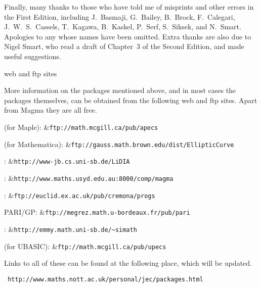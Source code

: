 \medskip

Finally, many thanks to those who have told me of misprints and other
errors in the First Edition, including J.~Basmaji, G.~Bailey,
B.~Brock, F.~Calegari, J.~W.~S.~Cassels, T.~Kagawa, B.~Kaskel,
P.~Serf, S.~Siksek, and N.~Smart.  Apologies to any whose names have
been omitted.  Extra thanks are also due to Nigel Smart, who read a
draft of Chapter~3 of the Second Edition, and made useful suggestions.

\head web and ftp sites \endhead

More information on the packages mentioned above, and in most cases
the packages themselves, can be obtained from the following web and
ftp sites.  Apart from {\smc Magma} they are all free.

\medskip
{}\columns
{} (for Maple):
&{\tt ftp://math.mcgill.ca/pub/apecs}\cr

 (for Mathematica):\cr
\+&{\tt ftp://gauss.math.brown.edu/dist/EllipticCurve}\cr

: 
&{\tt http://www-jb.cs.uni-sb.de/LiDIA}\cr

: 
&{\tt http://www.maths.usyd.edu.au:8000/comp/magma}\cr

:
&{\tt ftp://euclid.ex.ac.uk/pub/cremona/progs}\cr

\+PARI/GP: 
&{\tt ftp://megrez.math.u-bordeaux.fr/pub/pari}\cr

: 
&{\tt http://emmy.math.uni-sb.de/\~{}simath}\cr

 (for UBASIC):
&{\tt ftp://math.mcgill.ca/pub/upecs}\cr

\medskip

Links to all of these can be found at the following place, which will
be updated. 
 
\medskip

{\tt
http://www.maths.nott.ac.uk/personal/jec/packages.html}


\enddocument
